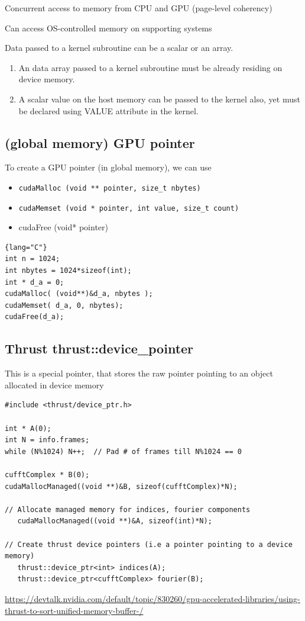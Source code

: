 Concurrent access to memory from CPU and GPU (page-level coherency)

Can access OS-controlled memory on supporting systems


Data passed to a kernel subroutine can be a scalar or an array.
\begin{enumerate}
\item An data array passed to a kernel subroutine must be already residing on device
memory. 

\item A scalar value on the host memory can be passed to the kernel
  also, yet must be declared using VALUE attribute in the kernel. 
\end{enumerate}


\subsection{(global memory) GPU pointer}

To create a GPU pointer (in global memory), we can use
\begin{itemize}
\item \verb!cudaMalloc (void ** pointer, size_t nbytes)!
\item \verb!cudaMemset (void * pointer, int value, size_t count)!
\item cudaFree (void* pointer)
\end{itemize}
\begin{lstlisting}{lang="C"}
int n = 1024;
int nbytes = 1024*sizeof(int);
int * d_a = 0;
cudaMalloc( (void**)&d_a, nbytes );
cudaMemset( d_a, 0, nbytes);
cudaFree(d_a);
\end{lstlisting}

\subsection{Thrust thrust::device\_pointer}
\label{sec:thrust::device_pointer}

This is a special pointer, that stores the raw pointer pointing to an object allocated in device memory
\begin{verbatim}
#include <thrust/device_ptr.h>

int * A(0);
int N = info.frames;
while (N%1024) N++;  // Pad # of frames till N%1024 == 0

cufftComplex * B(0);
cudaMallocManaged((void **)&B, sizeof(cufftComplex)*N);

// Allocate managed memory for indices, fourier components
   cudaMallocManaged((void **)&A, sizeof(int)*N); 

// Create thrust device pointers (i.e a pointer pointing to a device memory)
   thrust::device_ptr<int> indices(A);
   thrust::device_ptr<cufftComplex> fourier(B);
\end{verbatim}
\url{https://devtalk.nvidia.com/default/topic/830260/gpu-accelerated-libraries/using-thrust-to-sort-unified-memory-buffer-/}


